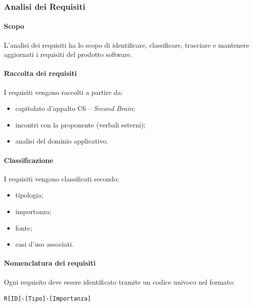 
\subsubsection{Analisi dei Requisiti}

\paragraph{Scopo}

L'analisi dei requisiti ha lo scopo di identificare, classificare, tracciare e mantenere
aggiornati i requisiti del prodotto software.

\paragraph{Raccolta dei requisiti}

I requisiti vengono raccolti a partire da:

\begin{itemize}
    \item capitolato d'appalto C6 -- \textit{Second Brain};
    \item incontri con la proponente (verbali esterni);
    \item analisi del dominio applicativo.
\end{itemize}

\paragraph{Classificazione}

I requisiti vengono classificati secondo:

\begin{itemize}
    \item tipologia;
    \item importanza;
    \item fonte;
    \item casi d'uso associati.
\end{itemize}

\paragraph{Nomenclatura dei requisiti}

Ogni requisito deve essere identificato tramite un codice univoco nel formato:

\begin{center}
\texttt{R[ID]-[Tipo]-[Importanza]}
\end{center}

